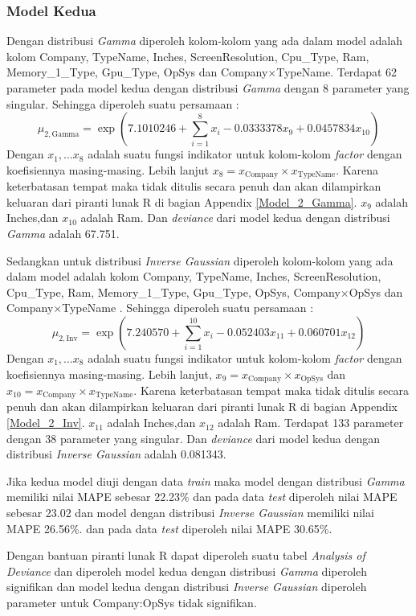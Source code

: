 \documentclass[12pt]{article}
\begin{document}
\subsubsection{Model Kedua}
Dengan distribusi \textit{Gamma} diperoleh kolom-kolom yang ada dalam model adalah kolom Company, TypeName, Inches, ScreenResolution, Cpu\_Type, Ram, Memory\_1\_Type, Gpu\_Type, OpSys dan Company$\times$TypeName. Terdapat 62 parameter pada model kedua dengan distribusi \textit{Gamma} dengan 8 parameter yang singular. Sehingga diperoleh suatu persamaan :
\begin{equation}
    \label{Gamma_eq2}
    \mu_{2,\text{Gamma}} = \exp{\left(7.1010246+\sum_{i=1}^8x_i -0.0333378x_9+0.0457834x_{10}\right)}
\end{equation}  
Dengan $x_1, \dots x_8$ adalah suatu fungsi indikator untuk kolom-kolom \textit{factor} dengan koefisiennya masing-masing. Lebih lanjut $x_8=x_{\text{Company}}\times x_{\text{TypeName}}$. Karena keterbatasan tempat maka tidak ditulis secara penuh dan akan dilampirkan keluaran dari piranti lunak R di bagian Appendix \ref{Model_2_Gamma}. $x_9$ adalah Inches,dan $x_{10}$ adalah Ram.  Dan \textit{deviance} dari model kedua dengan distribusi \textit{Gamma} adalah 67.751.
\par 
Sedangkan untuk distribusi \textit{Inverse Gaussian} diperoleh kolom-kolom yang ada dalam model adalah kolom Company, TypeName, Inches, ScreenResolution, Cpu\_Type, Ram, Memory\_1\_Type, Gpu\_Type, OpSys, Company$\times$OpSys dan Company$\times$TypeName .  Sehingga diperoleh suatu persamaan :
\begin{equation}
    \label{Inv_eq2}
    \mu_{2,\text{Inv}} = \exp{\left(7.240570+\sum_{i=1}^{10}x_i -0.052403x_{11}+0.060701x_{12}\right)}
\end{equation} 
Dengan $x_1, \dots x_8$ adalah suatu fungsi indikator untuk kolom-kolom \textit{factor} dengan koefisiennya masing-masing. Lebih lanjut, $x_9 = x_{\text{Company}}\times x_{\text{OpSys}}$ dan $x_{10} = x_{\text{Company}}\times x_{\text{TypeName}}$. Karena keterbatasan tempat maka tidak ditulis secara penuh dan akan dilampirkan keluaran dari piranti lunak R di bagian Appendix \ref{Model_2_Inv}. $x_{11}$ adalah Inches,dan $x_{12}$ adalah Ram. Terdapat 133 parameter dengan 38 parameter yang singular. Dan \textit{deviance} dari model kedua dengan distribusi \textit{Inverse Gaussian} adalah 0.081343. 
\par
Jika kedua model diuji dengan data \textit{train} maka model dengan distribusi \textit{Gamma} memiliki nilai MAPE sebesar 22.23\% dan pada data \textit{test} diperoleh nilai MAPE sebesar 23.02 dan model dengan distribusi \textit{Inverse Gaussian} memiliki nilai MAPE 26.56\%. dan pada data \textit{test} diperoleh nilai MAPE 30.65\%.    
\par
Dengan bantuan piranti lunak R dapat diperoleh suatu tabel \textit{Analysis of Deviance} dan diperoleh model kedua dengan distribusi \textit{Gamma} diperoleh signifikan dan model kedua dengan distribusi \textit{Inverse Gaussian} diperoleh parameter untuk Company:OpSys tidak signifikan.
\end{document}
